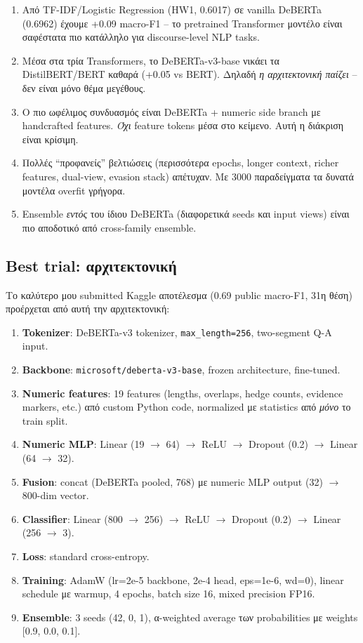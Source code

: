 \documentclass[12pt]{fphw}
\begin{document}
\begin{enumerate}
    \item Από TF-IDF/Logistic Regression (HW1, 0.6017) σε vanilla DeBERTa (0.6962) έχουμε +0.09 macro-F1 -- το pretrained Transformer μοντέλο είναι σαφέστατα πιο κατάλληλο για discourse-level NLP tasks.
    \item Μέσα στα τρία Transformers, το DeBERTa-v3-base νικάει τα DistilBERT/BERT καθαρά (+0.05 vs BERT). Δηλαδή \emph{η αρχιτεκτονική παίζει} -- δεν είναι μόνο θέμα μεγέθους.
    \item Ο πιο ωφέλιμος συνδυασμός είναι DeBERTa + numeric side branch με handcrafted features. \emph{Όχι} feature tokens μέσα στο κείμενο. Αυτή η διάκριση είναι κρίσιμη.
    \item Πολλές ``προφανείς'' βελτιώσεις (περισσότερα epochs, longer context, richer features, dual-view, evasion stack) απέτυχαν. Με 3000 παραδείγματα τα δυνατά μοντέλα overfit γρήγορα.
    \item Ensemble \emph{εντός} του ίδιου DeBERTa (διαφορετικά seeds και input views) είναι πιο αποδοτικό από cross-family ensemble.
\end{enumerate}

\subsection{Best trial: αρχιτεκτονική}

Το καλύτερο μου submitted Kaggle αποτέλεσμα (0.69 public macro-F1, 31η θέση) προέρχεται από αυτή την αρχιτεκτονική:

\begin{enumerate}
    \item \textbf{Tokenizer}: DeBERTa-v3 tokenizer, \texttt{max\_length=256}, two-segment Q-A input.
    \item \textbf{Backbone}: \texttt{microsoft/deberta-v3-base}, frozen architecture, fine-tuned.
    \item \textbf{Numeric features}: 19 features (lengths, overlaps, hedge counts, evidence markers, etc.) από custom Python code, normalized με statistics από \emph{μόνο} το train split.
    \item \textbf{Numeric MLP}: Linear (19 $\rightarrow$ 64) $\rightarrow$ ReLU $\rightarrow$ Dropout (0.2) $\rightarrow$ Linear (64 $\rightarrow$ 32).
    \item \textbf{Fusion}: concat (DeBERTa pooled, 768) με numeric MLP output (32) $\rightarrow$ 800-dim vector.
    \item \textbf{Classifier}: Linear (800 $\rightarrow$ 256) $\rightarrow$ ReLU $\rightarrow$ Dropout (0.2) $\rightarrow$ Linear (256 $\rightarrow$ 3).
    \item \textbf{Loss}: standard cross-entropy.
    \item \textbf{Training}: AdamW (lr=2e-5 backbone, 2e-4 head, eps=1e-6, wd=0), linear schedule με warmup, 4 epochs, batch size 16, mixed precision FP16.
    \item \textbf{Ensemble}: 3 seeds (42, 0, 1), α-weighted average των probabilities με weights [0.9, 0.0, 0.1].
\end{enumerate}
\end{document}
